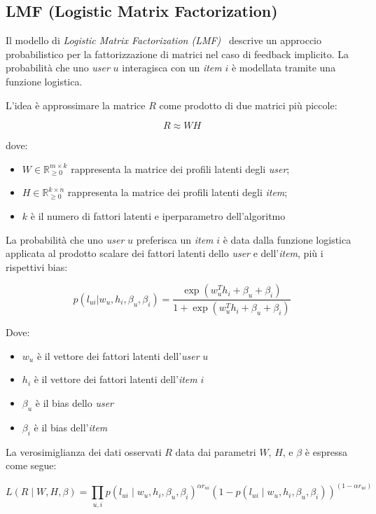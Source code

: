 \subsection{LMF (Logistic Matrix Factorization)}\label{lmf-logistic-matrix-factorization}

Il modello di \textit{Logistic Matrix Factorization (LMF)}~\cite{LMF} descrive un approccio probabilistico per la fattorizzazione di matrici nel caso di feedback implicito. La probabilità che uno \textit{user} $u$ interagisca con un \textit{item} $i$ è modellata tramite una funzione logistica.

L'idea è approssimare la matrice $R$ come prodotto di due matrici più piccole:

\[
R \approx WH
\]

dove:
\begin{itemize}
    \item $W \in \mathbb{R}_{\geq 0}^{m \times k}$ rappresenta la matrice dei profili latenti degli \textit{user};
    \item $H \in \mathbb{R}_{\geq 0}^{k \times n}$ rappresenta la matrice dei profili latenti degli \textit{item};
    \item $k$ è il numero di fattori latenti e iperparametro dell'algoritmo
\end{itemize}

La probabilità che uno \textit{user} $u$ preferisca un \textit{item} $i$ è data dalla funzione logistica applicata al prodotto scalare dei fattori latenti dello \textit{user} e dell'\textit{item}, più i rispettivi bias:

\[
p(l_{ui} | w_u, h_i, \beta_u, \beta_i) = \frac{\exp(w_u^T h_i + \beta_u + \beta_i)}{1 + \exp(w_u^T h_i + \beta_u + \beta_i)}
\]

Dove:
\begin{itemize}
    \item $w_u$ è il vettore dei fattori latenti dell'\textit{user} $u$
    \item $h_i$ è il vettore dei fattori latenti dell'\textit{item} $i$
    \item $\beta_u$ è il bias dello \textit{user}
    \item $\beta_i$ è il bias dell'\textit{item}
\end{itemize}

La verosimiglianza dei dati osservati $R$ data dai parametri $W$, $H$, e $\beta$ è espressa come segue:

\[
L(R \mid W, H, \beta) = \prod_{u, i} p(l_{ui} \mid w_u, h_i, \beta_u, \beta_i)^{\alpha r_{ui}} 
\left( 1 - p(l_{ui} \mid w_u, h_i, \beta_u, \beta_i) \right)^{(1 - \alpha r_{ui})}
\]

